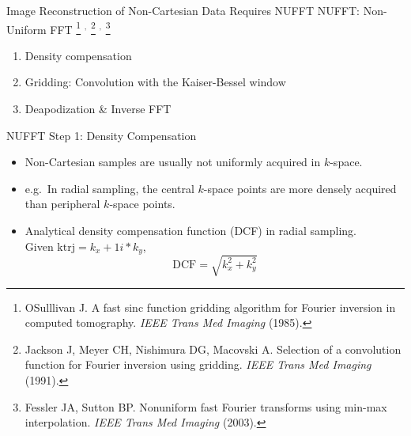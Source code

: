 \begin{frame}{Image Reconstruction of Non-Cartesian Data Requires NUFFT}
	NUFFT: Non-Uniform FFT \footnote{OSulllivan J. A fast sinc function gridding algorithm for Fourier inversion in computed tomography. \textit{IEEE Trans Med Imaging} (1985).}
	$^,$ \footnote{Jackson J, Meyer CH, Nishimura DG, Macovski A. Selection of a convolution function for Fourier inversion using gridding. \textit{IEEE Trans Med Imaging} (1991).}
	$^,$ \footnote{Fessler JA, Sutton BP. Nonuniform fast Fourier transforms using min-max interpolation. \textit{IEEE Trans Med Imaging} (2003).}
    \vspace{1em}
	\begin{enumerate}
		\item Density compensation
		\item Gridding: Convolution with the Kaiser-Bessel window
		\item Deapodization \& Inverse FFT
	\end{enumerate}
\end{frame}


\begin{frame}[fragile]{NUFFT Step 1: Density Compensation}

    \begin{itemize}
        \item Non-Cartesian samples are usually not uniformly acquired in $k$-space.
        \item e.g.~In radial sampling, the central $k$-space points are more densely acquired than peripheral $k$-space points.
        \item Analytical density compensation function (DCF) in radial sampling. \\
        \vspace{1em}
        Given $\mathrm{ktrj} = k_x + 1i * k_y$, \\
        \begin{equation}
        	\mathrm{DCF} = \sqrt{k_x^2 + k_y^2}
        \end{equation}
    \end{itemize}

\end{frame}


